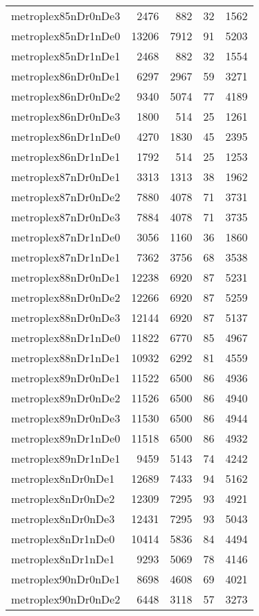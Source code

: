 \begin{longtable}{lrrrr}
metroplex85nDr0nDe3 & 2476 & 882 & 32 & 1562 \\
metroplex85nDr1nDe0 & 13206 & 7912 & 91 & 5203 \\
metroplex85nDr1nDe1 & 2468 & 882 & 32 & 1554 \\
metroplex86nDr0nDe1 & 6297 & 2967 & 59 & 3271 \\
metroplex86nDr0nDe2 & 9340 & 5074 & 77 & 4189 \\
metroplex86nDr0nDe3 & 1800 & 514 & 25 & 1261 \\
metroplex86nDr1nDe0 & 4270 & 1830 & 45 & 2395 \\
metroplex86nDr1nDe1 & 1792 & 514 & 25 & 1253 \\
metroplex87nDr0nDe1 & 3313 & 1313 & 38 & 1962 \\
metroplex87nDr0nDe2 & 7880 & 4078 & 71 & 3731 \\
metroplex87nDr0nDe3 & 7884 & 4078 & 71 & 3735 \\
metroplex87nDr1nDe0 & 3056 & 1160 & 36 & 1860 \\
metroplex87nDr1nDe1 & 7362 & 3756 & 68 & 3538 \\
metroplex88nDr0nDe1 & 12238 & 6920 & 87 & 5231 \\
metroplex88nDr0nDe2 & 12266 & 6920 & 87 & 5259 \\
metroplex88nDr0nDe3 & 12144 & 6920 & 87 & 5137 \\
metroplex88nDr1nDe0 & 11822 & 6770 & 85 & 4967 \\
metroplex88nDr1nDe1 & 10932 & 6292 & 81 & 4559 \\
metroplex89nDr0nDe1 & 11522 & 6500 & 86 & 4936 \\
metroplex89nDr0nDe2 & 11526 & 6500 & 86 & 4940 \\
metroplex89nDr0nDe3 & 11530 & 6500 & 86 & 4944 \\
metroplex89nDr1nDe0 & 11518 & 6500 & 86 & 4932 \\
metroplex89nDr1nDe1 & 9459 & 5143 & 74 & 4242 \\
metroplex8nDr0nDe1 & 12689 & 7433 & 94 & 5162 \\
metroplex8nDr0nDe2 & 12309 & 7295 & 93 & 4921 \\
metroplex8nDr0nDe3 & 12431 & 7295 & 93 & 5043 \\
metroplex8nDr1nDe0 & 10414 & 5836 & 84 & 4494 \\
metroplex8nDr1nDe1 & 9293 & 5069 & 78 & 4146 \\
metroplex90nDr0nDe1 & 8698 & 4608 & 69 & 4021 \\
metroplex90nDr0nDe2 & 6448 & 3118 & 57 & 3273 \\

\end{longtable}
